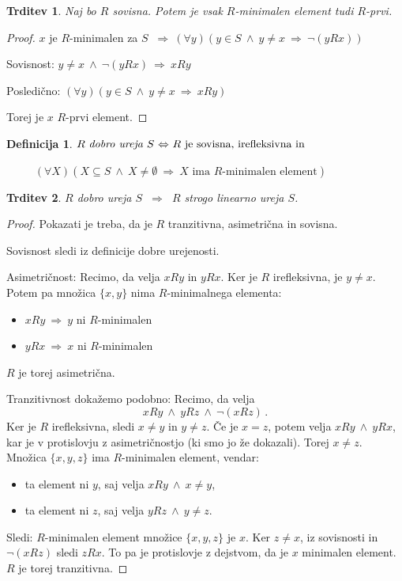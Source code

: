 \documentclass[11pt,paper=b5,DIV=13,headinclude,footinclude]{scrbook}
\def\inn {{~\wedge~}}
\def\sledi {{~\Rightarrow~}}
\def\cee {{~\Leftrightarrow~}}
\newtheorem*{trditev}{Trditev}
\newtheorem*{definicija}{Definicija}
\begin{document}
\newpage

\begin{trditev}
Naj bo $R$ sovisna. Potem je vsak $R$-minimalen element tudi $R$-prvi.
\end{trditev}

\begin{proof}
$x$ je $R$-minimalen za $S$ $\sledi (\forall y)(y\in S\inn y\neq x\sledi \neg (yRx))$

Sovisnost: $y\neq x\inn \neg (yRx)\sledi xRy$

Posledično:
$(\forall y)(y\in S\inn y\neq x\sledi xRy)$

Torej je $x$ $R$-prvi element.
\end{proof}


\begin{definicija}
$R \textrm{ {\em dobro ureja }} S \cee R \textrm{ je sovisna, irefleksivna in }$

~~~~~$(\forall X)(X\subseteq S\inn X\neq\emptyset\sledi X \textrm{ ima $R$-minimalen element})$
\end{definicija}

\begin{trditev}
$R$ dobro ureja $S$ $\sledi$ $R$ strogo linearno ureja $S$.
\end{trditev}

\begin{proof}
Pokazati je treba, da je $R$ tranzitivna, asimetrična in sovisna.

Sovisnost sledi iz definicije dobre urejenosti.

Asimetričnost: Recimo, da velja $xRy$ in $yRx$. Ker je $R$ irefleksivna, je $y\neq x$.
Potem pa množica $\{x,y\}$ nima $R$-minimalnega elementa:
\begin{itemize}
  \item $xRy\sledi y$ ni $R$-minimalen
  \item $yRx\sledi x$ ni $R$-minimalen
\end{itemize}
$R$ je torej asimetrična.

Tranzitivnost dokažemo podobno: Recimo, da velja
$$xRy\inn yRz\inn \neg(xRz)\,.$$
Ker je $R$ irefleksivna, sledi $x\neq y$ in $y\neq z$.
Če je $x = z$, potem velja $xRy\inn yRx$, kar je v protislovju z asimetričnostjo (ki smo jo že dokazali).
Torej $x\neq z$.
Množica $\{x,y,z\}$ ima $R$-minimalen element, vendar:
\begin{itemize}
  \item ta element ni $y$, saj velja $xRy \inn x\neq y$,
  \item ta element ni $z$, saj velja $yRz \inn y\neq z$.
\end{itemize}
Sledi: $R$-minimalen element množice $\{x,y,z\}$ je $x$.
Ker $z\neq x$, iz sovisnosti in $\neg(xRz)$ sledi $zRx$.
To pa je protislovje z dejstvom, da je $x$ minimalen element.
$R$ je torej tranzitivna.
\end{proof}
\end{document}
